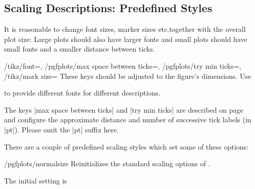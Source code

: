 \subsection{Scaling Descriptions: Predefined Styles}
\label{sec:scaling:styles}

It is reasonable to change font sizes, marker sizes etc.\@ together with the
overall plot size: Large plots should also have larger fonts and small plots
should have small fonts and a smaller distance between ticks.

\begin{keylist}{%
    /tikz/font=,
    /pgfplots/max space between ticks=,
    /pgfplots/try min ticks=,
    /tikz/mark size=%
}
    These keys should be adjusted to the figure's dimensions. Use
\begin{codeexample}
\end{codeexample}
    to provide different fonts for different descriptions.

    The keys |max space between ticks| and |try min ticks| are described on
    page~\pageref{maxspacebetweenticks} and configure the approximate distance
    and number of successive tick labels (in |pt|). Please omit the |pt| suffix
    here.
\end{keylist}

There are a couple of predefined scaling styles which set some of these
options:

\begin{stylekey}{/pgfplots/normalsize}
    Reinitializes the standard scaling options of \PGFPlots{}.
\begin{codeexample}[]
\end{codeexample}

    The initial setting is
\begin{codeexample}
\end{codeexample}
\end{stylekey}

